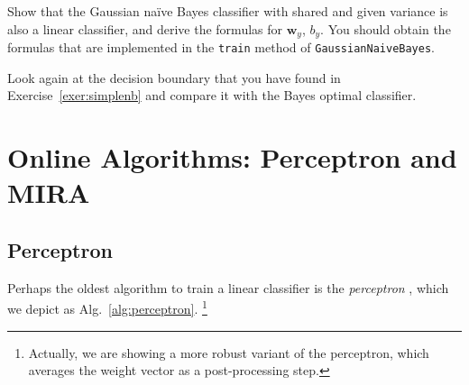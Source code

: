 \begin{exercise}
Show that the Gaussian na\"ive Bayes classifier with shared and given
  variance is also a linear classifier, and derive the formulas for
  $\boldsymbol{w}_y$, $b_y$. 
You should obtain the formulas that are implemented in the {\tt train} method  
of {\tt GaussianNaiveBayes}. 

Look again at the decision boundary that you have found in Exercise~\ref{exer:simplenb} 
and compare it with the Bayes optimal classifier. 
\end{exercise}

\section{ Online Algorithms: Perceptron and MIRA}

\subsection{\label{s:perceptron} Perceptron}

Perhaps the oldest algorithm to train a linear classifier is the \emph{perceptron} \citep{Rosenblatt1958}, 
which we depict as Alg.~\ref{alg:perceptron}.%
\footnote{Actually, we are showing a more robust variant of the perceptron, 
which averages the weight vector as a post-processing step.} 

